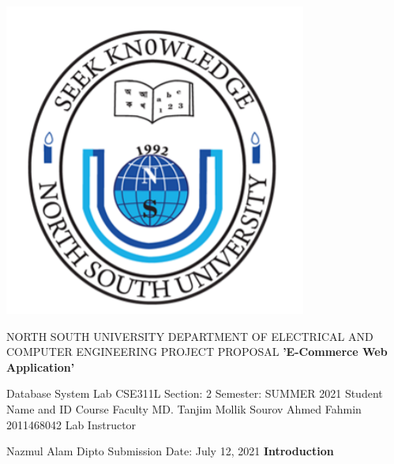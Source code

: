 \documentclass{article}
\begin{document}
\centering
\includegraphics{images/nsu.PNG}
\centering

\LARGE{N}\Large{ORTH}
\LARGE{S}\Large{OUTH}
\LARGE{U}\Large{NIVERSITY}
\linebreak
\Large{D}\large{EPARTMENT OF}
\Large{E}\large{LECTRICAL AND}
\Large{C}\large{OMPUTER}
\Large{E}\large{NGINEERING}
\linebreak
\Large{P}\large{ROJECT}
\Large{P}\large{ROPOSAL}
\linebreak
\linebreak
\textbf{'E-Commerce Web Application'}
\linebreak

\Large{Database System Lab}
\linebreak
\Large{CSE311L}
\linebreak
\Large{Section: 2}
\linebreak
\Large{Semester: SUMMER 2021}
\flushleft
\Large{Student Name and ID} 
\hspace{2.1cm}
\Large{Course Faculty} 
\linebreak
\Large{MD. Tanjim Mollik Sourov}
\hspace{1cm}
\Large{Ahmed Fahmin}
\linebreak
\Large{2011468042}
\hspace{4.4cm}
\Large{Lab Instructor}


\hspace{6.5cm}
\Large{Nazmul Alam Dipto}
\linebreak
\centering
\linebreak
\Large{Submission Date: July 12, 2021}
\newpage
\huge\textbf{Introduction}
\end{document}

